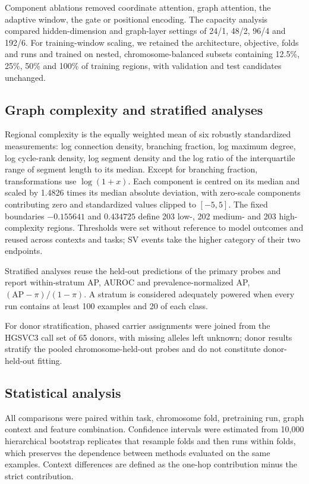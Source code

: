 \documentclass[11pt]{article}
\begin{document}
\begin{bibunit}[unsrtnat]
Component ablations removed coordinate attention, graph attention, the adaptive window, the gate or positional encoding. The capacity analysis compared hidden-dimension and graph-layer settings of 24/1, 48/2, 96/4 and 192/6. For training-window scaling, we retained the architecture, objective, folds and runs and trained on nested, chromosome-balanced subsets containing 12.5\%, 25\%, 50\% and 100\% of training regions, with validation and test candidates unchanged.

\subsection{Graph complexity and stratified analyses}
\label{sec:complexity-methods}

Regional complexity is the equally weighted mean of six robustly standardized measurements: log connection density, branching fraction, log maximum degree, log cycle-rank density, log segment density and the log ratio of the interquartile range of segment length to its median. Except for branching fraction, transformations use $\log(1+x)$. Each component is centred on its median and scaled by 1.4826 times its median absolute deviation, with zero-scale components contributing zero and standardized values clipped to $[-5,5]$. The fixed boundaries $-0.155641$ and $0.434725$ define 203 low-, 202 medium- and 203 high-complexity regions. Thresholds were set without reference to model outcomes and reused across contexts and tasks; SV events take the higher category of their two endpoints.

Stratified analyses reuse the held-out predictions of the primary probes and report within-stratum AP, AUROC and prevalence-normalized AP, $(\mathrm{AP}-\pi)/(1-\pi)$. A stratum is considered adequately powered when every run contains at least 100 examples and 20 of each class.

For donor stratification, phased carrier assignments were joined from the HGSVC3 call set of 65 donors, with missing alleles left unknown; donor results stratify the pooled chromosome-held-out probes and do not constitute donor-held-out fitting.

\subsection{Statistical analysis}
\label{sec:stats}

All comparisons were paired within task, chromosome fold, pretraining run, graph context and feature combination. Confidence intervals were estimated from 10,000 hierarchical bootstrap replicates that resample folds and then runs within folds, which preserves the dependence between methods evaluated on the same examples. Context differences are defined as the one-hop contribution minus the strict contribution.


\end{bibunit}
\end{document}
